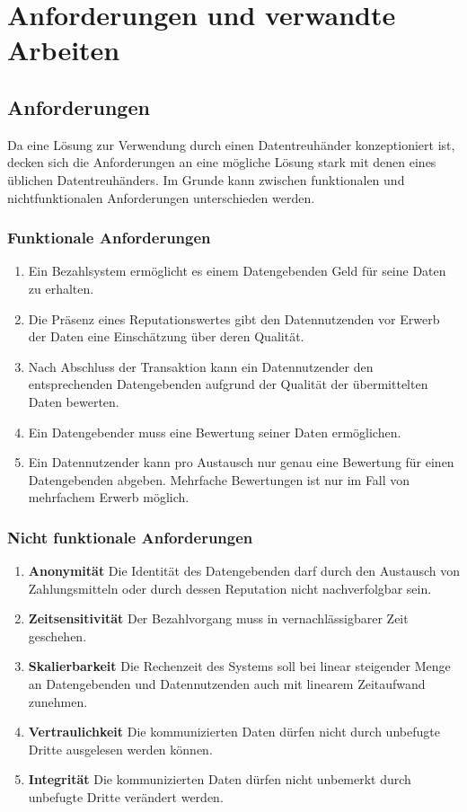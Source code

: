 \documentclass[11pt,a4paper]{scrreprt}
\begin{document}


\chapter{Anforderungen und verwandte Arbeiten}
\section{Anforderungen}
\label{sec:req}
Da eine Lösung zur Verwendung durch einen Datentreuhänder konzeptioniert ist, decken sich die Anforderungen an eine mögliche Lösung stark mit denen eines üblichen Datentreuhänders. Im Grunde kann zwischen funktionalen und nichtfunktionalen Anforderungen unterschieden werden.

\subsection{Funktionale Anforderungen}
\label{enum:req:funktional}
\begin{enumerate}
    \item Ein Bezahlsystem ermöglicht es einem Datengebenden Geld für seine Daten zu erhalten.
    
    \item Die Präsenz eines Reputationswertes gibt den Datennutzenden vor Erwerb der Daten eine Einschätzung über deren Qualität.
    \item Nach Abschluss der Transaktion kann ein Datennutzender den entsprechenden Datengebenden aufgrund der Qualität der übermittelten Daten bewerten.
    \item Ein Datengebender muss eine Bewertung seiner Daten ermöglichen.
    \item Ein Datennutzender kann pro Austausch nur genau eine Bewertung für einen Datengebenden abgeben. Mehrfache Bewertungen ist nur im Fall von mehrfachem Erwerb möglich.
\end{enumerate}

\subsection{Nicht funktionale Anforderungen}
\label{enum:req:nichtfunktional}
\begin{enumerate}
    \item \textbf{Anonymität} Die Identität des Datengebenden darf durch den Austausch von Zahlungsmitteln oder durch dessen Reputation nicht nachverfolgbar sein.
    \item \textbf{Zeitsensitivität} Der Bezahlvorgang muss in vernachlässigbarer Zeit geschehen.
    \item \textbf{Skalierbarkeit} Die Rechenzeit des Systems soll bei linear steigender Menge an Datengebenden und Datennutzenden auch mit linearem Zeitaufwand zunehmen.
    \item \textbf{Vertraulichkeit} Die kommunizierten Daten dürfen nicht durch unbefugte Dritte ausgelesen werden können.
    \item \textbf{Integrität} Die kommunizierten Daten dürfen nicht unbemerkt durch unbefugte Dritte verändert werden.
\end{enumerate}
\end{document}
